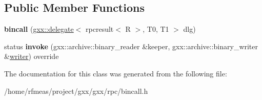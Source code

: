\subsection*{Public Member Functions}
\begin{DoxyCompactItemize}
\item 
{\bfseries bincall} (\hyperlink{classgxx_1_1delegate}{gxx\+::delegate}$<$ rpcresult$<$ R $>$, T0, T1 $>$ dlg)\hypertarget{classgxx_1_1rpc_1_1bincall_3_01gxx_1_1delegate_3_01rpcresult_3_01R_01_4_00_01T0_00_01T1_01_4_01_4_a9148af49bceb1ec1565bb9722c39ca14}{}\label{classgxx_1_1rpc_1_1bincall_3_01gxx_1_1delegate_3_01rpcresult_3_01R_01_4_00_01T0_00_01T1_01_4_01_4_a9148af49bceb1ec1565bb9722c39ca14}

\item 
status {\bfseries invoke} (gxx\+::archive\+::binary\+\_\+reader \&keeper, gxx\+::archive\+::binary\+\_\+writer \&\hyperlink{classgxx_1_1writer}{writer}) override\hypertarget{classgxx_1_1rpc_1_1bincall_3_01gxx_1_1delegate_3_01rpcresult_3_01R_01_4_00_01T0_00_01T1_01_4_01_4_a95b132821e3294caae527afd59487166}{}\label{classgxx_1_1rpc_1_1bincall_3_01gxx_1_1delegate_3_01rpcresult_3_01R_01_4_00_01T0_00_01T1_01_4_01_4_a95b132821e3294caae527afd59487166}

\end{DoxyCompactItemize}


The documentation for this class was generated from the following file\+:\begin{DoxyCompactItemize}
\item 
/home/rfmeas/project/gxx/gxx/rpc/bincall.\+h\end{DoxyCompactItemize}
